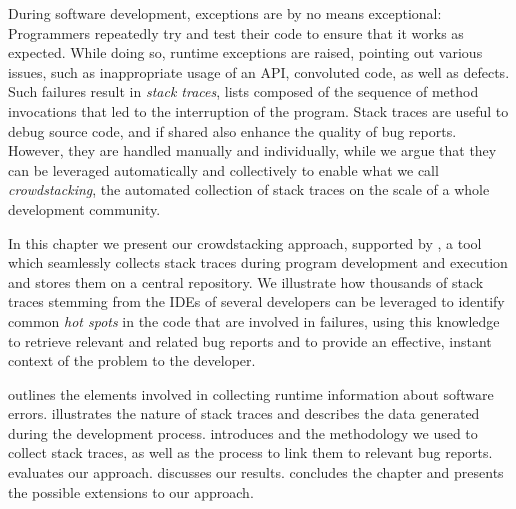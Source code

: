 




During software development, exceptions are by no means exceptional: Programmers repeatedly try and test their code to ensure that it works as expected.
While doing so, runtime exceptions are raised, pointing out various issues, such as inappropriate usage of an API, convoluted code, as well as defects.
Such failures result in \emph{stack traces}, lists composed of the sequence of method invocations that led to the interruption of the program.
Stack traces are useful to debug source code, and if shared also enhance the quality of bug reports.
However, they are handled manually and individually, while we argue that they can be leveraged automatically and collectively to enable what we call \emph{crowdstacking}, the automated collection of stack traces on the scale of a whole development community.

In this chapter we present our crowdstacking approach, supported by \slr, a tool which seamlessly collects stack traces during program development and execution and stores them on a central repository.
We illustrate how thousands of stack traces stemming from the IDEs of several developers can be leveraged to identify common \emph{hot spots} in the code that are involved in failures, using this knowledge to retrieve relevant and related bug reports and to provide an effective, instant context of the problem to the developer.

\structure

 outlines the elements involved in collecting runtime information about software errors.
 illustrates the nature of stack traces and describes the data generated during the development process.
 introduces \slr and the methodology we used to collect stack traces, as well as the process to link them to relevant bug reports.
 evaluates our approach.
 discusses our results.
 concludes the chapter and presents the possible extensions to our approach.



